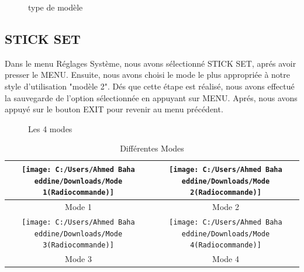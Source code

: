 \documentclass[a4paper,12pt]{book}
\begin{document}
\begin{figure}[h]
	\begin{center}
		\centering
	\end{center}
	\caption{type de modèle}
\end{figure}
\subsection{STICK SET }
Dans le menu Réglages Système, nous avons sélectionné STICK SET, aprés avoir presser le MENU. Ensuite, nous avons choisi le mode le plus appropriée à notre style d'utilisation "modèle 2". Dés que cette étape est réalisé, nous avons effectué la sauvegarde de l'option sélectionnée en appuyant sur MENU. Aprés, nous avons appuyé sur le bouton EXIT pour revenir au menu précédent.
\begin{figure}[h]
	\begin{center}
		\centering
	\end{center}
	\caption{Les 4 modes}
\end{figure}
\newpage
\begin{table}[h]
	\begin{center}
		\caption{Différentes Modes }
		\begin{tabular}{|c|c|}
			\hline
			
			\centering
			
			\texttt{[image: C:/Users/Ahmed Baha eddine/Downloads/Mode 1(Radiocommande)]} & \texttt{[image: C:/Users/Ahmed Baha eddine/Downloads/Mode 2(Radiocommande)]}\\
			\hline
			\centering
			
			Mode 1 & Mode 2 \\
			
			\hline
			\centering
			\texttt{[image: C:/Users/Ahmed Baha eddine/Downloads/Mode 3(Radiocommande)]}& \texttt{[image: C:/Users/Ahmed Baha eddine/Downloads/Mode 4(Radiocommande)]}\\
			\hline
			\centering
			
			Mode 3 &  Mode 4 \\
			\hline
		\end{tabular}
	\end{center}
\end{table}
\end{document}
